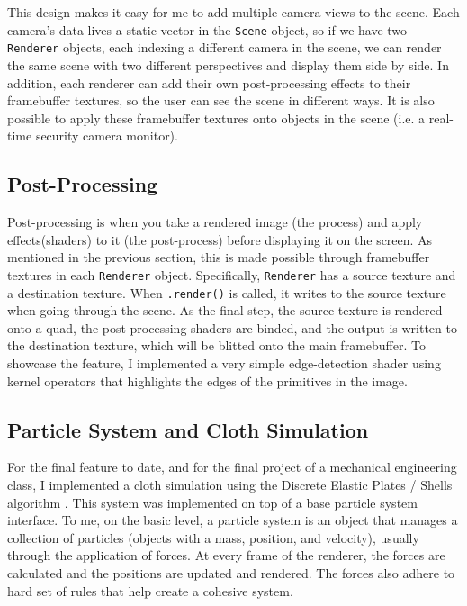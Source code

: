 \documentclass[letterpaper, 10 pt, conference]{ieeeconf}  %
\begin{document}
This design makes it easy for me to add multiple camera views to the scene. Each camera's data lives a static vector in the \texttt{Scene} object, so if we have two \texttt{Renderer} objects, each indexing a different camera in the scene, we can render the same scene with two different perspectives and display them side by side. In addition, each renderer can add their own post-processing effects to their framebuffer textures, so the user can see the scene in different ways. It is also possible to apply these framebuffer textures onto objects in the scene (i.e. a real-time security camera monitor).

\subsection {Post-Processing}
Post-processing is when you take a rendered image (the process) and apply effects(shaders) to it (the post-process) before displaying it on the screen. As mentioned in the previous section, this is made possible through framebuffer textures in each \texttt{Renderer} object. Specifically, \texttt{Renderer} has a source texture and a destination texture. When \texttt{.render()} is called, it writes to the source texture when going through the scene. As the final step, the source texture is rendered onto a quad, the post-processing shaders are binded, and the output is written to the destination texture, which will be blitted onto the main framebuffer. To showcase the feature, I implemented a very simple edge-detection shader using kernel operators that highlights the edges of the primitives in the image. 

\subsection {Particle System and Cloth Simulation}
For the final feature to date, and for the final project of a mechanical engineering class, I implemented a cloth simulation using the Discrete Elastic Plates / Shells algorithm\cite{baraff1998large} \cite{Grinspun2003discrete}. This system was implemented on top of a base particle system interface. To me, on the basic level, a particle system is an object that manages a collection of particles (objects with a mass, position, and velocity), usually through the application of forces. At every frame of the renderer, the forces are calculated and the positions are updated and rendered. The forces also adhere to hard set of rules that help create a cohesive system.
\end{document}
